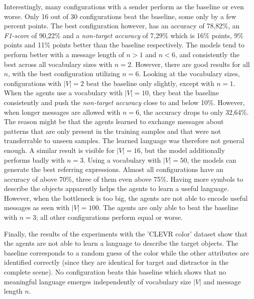 Interestingly, many configurations with a sender perform as the baseline or even worse.
Only 16 out of 30 configurations beat the baseline, some only by a few percent points.
The best configuration however, has an accuracy of 78,82\%, an \emph{F1-score} of 90,22\% and a \emph{non-target accuracy} of 7,29\% which is 16\% points, 9\% points and 11\% points better than the baseline respectively.
The models tend to perform better with a message length of $n>1$ and $n<6$, and consistently the best across all vocabulary sizes with $n=2$.
However, there are good results for all $n$, with the best configuration utilizing $n=6$.
Looking at the vocabulary sizes, configurations with $|V|=2$ beat the baseline only slightly, except with $n=1$.
When the agents use a vocabulary with $|V|=10$, they beat the baseline consistently and push the \emph{non-target accuracy} close to and below 10\%.
However, when longer messages are allowed with $n=6$, the accuracy drops to only 32,64\%.
The reason might be that the agents learned to exchange messages about patterns that are only present in the training samples and that were not transferrable to unseen samples.
The learned language was therefore not general enough.
A similar result is visible for $|V|=16$, but the model additionally performs badly with $n=3$.
Using a vocabulary with $|V|=50$, the models can generate the best referring expressions.
Almost all configurations have an accuracy of above 70\%, three of them even above 75\%.
Having more symbols to describe the objects apparently helps the agents to learn a useful language.
However, when the bottleneck is too big, the agents are not able to encode useful messages as seen with $|V|=100$.
The agents are only able to beat the baseline with $n=3$; all other configurations perform equal or worse.

Finally, the results of the experiments with the 'CLEVR color' dataset show that the agents are not able to learn a language to describe the target objects.
The baseline corresponds to a random guess of the color while the other attributes are identified correctly (since they are identical for target and distractor in the complete scene).
No configuration beats this baseline which shows that no meaningful language emerges independently of vocabulary size $|V|$ and message length $n$.


